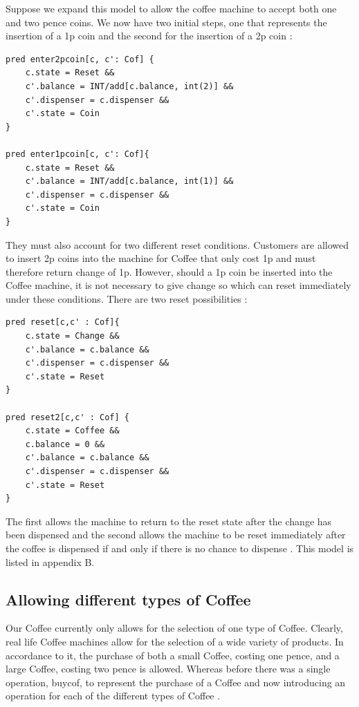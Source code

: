 \documentclass[a4paper,10pt]{report}
\begin{document}
Suppose we expand this model to allow the coffee machine to accept both one and two pence coins. We now have two initial steps, one that represents the insertion of a 1p coin and the second for the insertion of a 2p coin \cite{Boyatt}:

\begin{verbatim}
pred enter2pcoin[c, c': Cof] {
	c.state = Reset &&
	c'.balance = INT/add[c.balance, int(2)] &&
	c'.dispenser = c.dispenser &&
	c'.state = Coin
}

pred enter1pcoin[c, c': Cof]{
	c.state = Reset &&
	c'.balance = INT/add[c.balance, int(1)] &&
	c'.dispenser = c.dispenser &&
	c'.state = Coin
}
\end{verbatim}
They must also account for two different reset conditions. Customers are allowed to insert 2p coins into the machine for Coffee that only cost 1p and must therefore return change of 1p. However, should a 1p coin be inserted into the Coffee machine, it is not necessary to give change so which can reset immediately under these conditions. There are two reset possibilities \cite{Boyatt}:

\begin{verbatim}
pred reset[c,c' : Cof]{
	c.state = Change &&
	c'.balance = c.balance &&
	c'.dispenser = c.dispenser &&
	c'.state = Reset
}

pred reset2[c,c' : Cof] {
	c.state = Coffee &&
	c.balance = 0 &&
	c'.balance = c.balance &&
	c'.dispenser = c.dispenser &&
	c'.state = Reset
}
\end{verbatim}

The first allows the machine to return to the reset state after the change has been dispensed and the second allows the machine to be reset immediately after the coffee is dispensed if and only if there is no chance to dispense \cite{Boyatt}. This model is listed in appendix B.

\subsection{Allowing different types of Coffee}
\label{Different Coffees}

Our Coffee currently only allows for the selection of one type of Coffee. Clearly, real life Coffee machines allow for the selection of a wide variety of products. In accordance to it, the purchase of both a small Coffee, costing one pence, and a large Coffee, costing two pence is allowed. Whereas before there was a single operation, buycof, to represent the purchase of a Coffee and now introducing an operation for each of the different types of Coffee \cite{Boyatt}.
\end{document}
